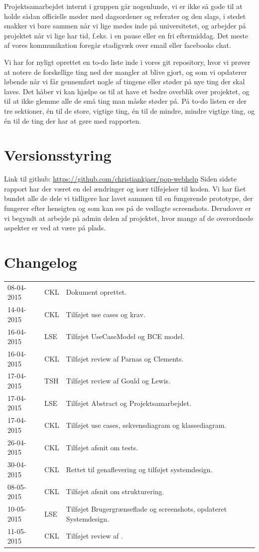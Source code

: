 \documentclass[11pt, a4paper]{article}
\begin{document}
Projektsamarbejdet internt i gruppen går nogenlunde, vi er ikke så gode til at holde sådan officielle møder  med dagsordener og referater og den slags, i stedet snakker vi bare sammen når vi lige mødes inde på universitetet, og arbejder på projektet når vi lige har tid, f.eks. i en pause eller en fri eftermiddag. Det meste af vores kommunikation foregår stadigvæk over email eller facebooks chat. 

Vi har for nyligt oprettet en to-do liste inde i vores git repository, hvor vi prøver at notere de forskellige ting ned der mangler at blive gjort, og som vi opdaterer løbende når vi får gennemført nogle af tingene eller støder på nye ting der skal laves. Det håber vi kan hjælpe os til at have et bedre overblik over projektet, og til at ikke glemme alle de små ting man måske støder på. På to-do listen er der tre sektioner, én til de store, vigtige ting, én til de mindre, mindre vigtige ting, og én til de ting der har at gøre med rapporten.

\newpage
\appendix
\section{Versionsstyring}
\label{sec:versionsstyring}
Link til github: \url{https://github.com/christiankjaer/pop-webhelp}
Siden sidste rapport har der været en del ændringer og især tilføjelser til koden. Vi har fået bundet alle de dele vi tidligere har lavet sammen til en fungerende prototype, der fungerer efter hensigten og som kan ses på de vedlagte screenshots. Derudover er vi begyndt at arbejde på admin delen af projektet, hvor mange af de overordnede aspekter er ved at være på plads.

\section{Changelog}
\label{sec:changelog}
\begin{tabular}{l l l}
08-04-2015 & CKL & Dokument oprettet. \\
14-04-2015 & CKL & Tilføjet use cases og krav. \\
16-04-2015 & LSE & Tilføjet UseCaseModel og BCE model. \\
16-04-2015 & CKL & Tilføjet review af Parnas og Clements. \\
17-04-2015 & TSH & Tilføjet review af Gould og Lewis. \\
17-04-2015 & LSE & Tilføjet Abstract og Projektsamarbejdet. \\
17-04-2015 & CKL & Tilføjet use cases, sekvensdiagram og klassediagram. \\
26-04-2015 & CKL & Tilføjet afsnit om tests. \\
30-04-2015 & CKL & Rettet til genaflevering og tilføjet systemdesign. \\
08-05-2015 & CKL & Tilføjet afsnit om strukturering. \\
10-05-2015 & LSE & Tilføjet Brugergrænseflade og screenshots, opdateret Systemdesign. \\
11-05-2015 & CKL & Tilføjet review af \cite{nsbullet}. \\
\end{tabular}
\end{document}
